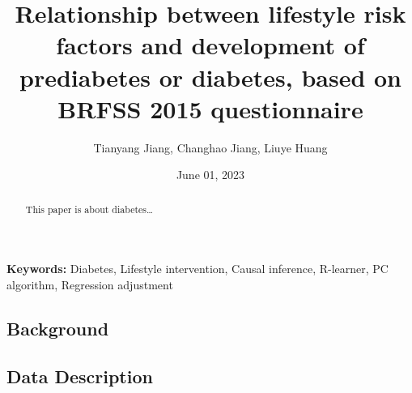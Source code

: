 \documentclass[
  12pt,
]{article}
\title{Relationship between lifestyle risk factors and development of
prediabetes or diabetes, based on BRFSS 2015 questionnaire}
\author{Tianyang Jiang, Changhao Jiang, Liuye Huang}
\date{June 01, 2023}
\begin{document}
\maketitle
\begin{abstract}
This paper is about diabetes\ldots{}
\end{abstract}

\textbf{Keywords:} Diabetes, Lifestyle intervention, Causal inference,
R-learner, PC algorithm, Regression adjustment

\hypertarget{background}{%
\subsection{Background}\label{background}}

\hypertarget{data-description}{%
\subsection{Data Description}\label{data-description}}
\end{document}
